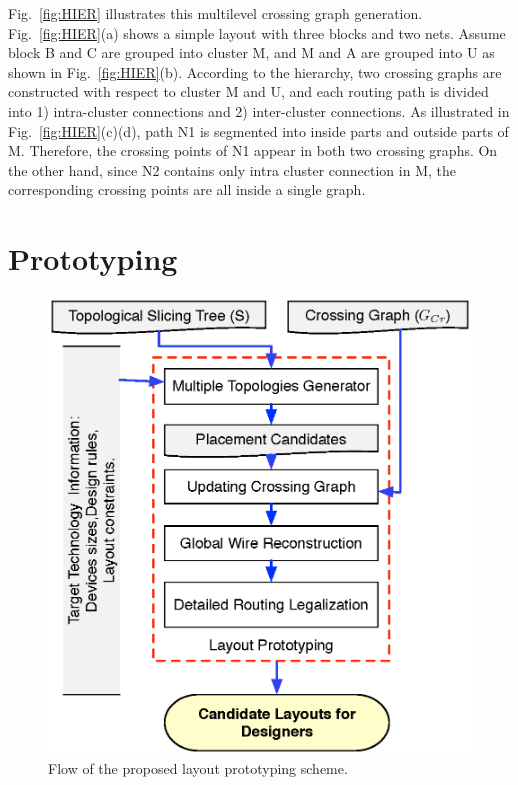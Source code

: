       Fig.~\ref{fig:HIER} illustrates this multilevel crossing graph generation.
      Fig.~\ref{fig:HIER}(a) shows a simple layout with three blocks and two nets.
      Assume block B and C are grouped into cluster M, and M and A are grouped into U as shown in Fig.~\ref{fig:HIER}(b).
      According to the hierarchy, two crossing graphs are constructed with respect to cluster M and U, and
      each routing path is divided into 1) intra-cluster connections and 2) inter-cluster connections. 
      As illustrated in Fig.~\ref{fig:HIER}(c)(d), path N1 is segmented into inside parts and outside parts of M. 
      Therefore, the crossing points of N1 appear in both two crossing graphs. 
      On the other hand, since N2 contains only intra cluster connection in M, the corresponding crossing points are all inside a single graph.

  \section{Prototyping}\label{sec:Proto}

    \begin{figure}[t]
      \centering
      \includegraphics[height=0.7\textwidth]{Fig/Chapter4/Proto_Flow.eps}
      \caption{Flow of the proposed layout prototyping scheme.} 
      \label{fig:Proto_Flow}
    \end{figure}


